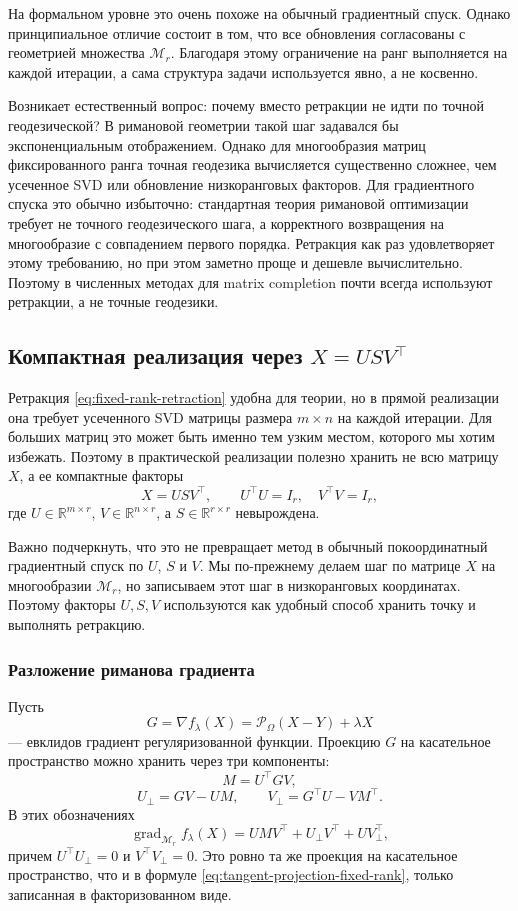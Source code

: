 \documentclass[a4paper,12pt]{article}
\newcommand{\R}{\mathbb{R}}
\newcommand{\grad}{\operatorname{grad}}
\renewcommand{\Proj}{\mathcal{P}}
\newcommand{\Mcal}{\mathcal{M}}
\begin{document}
На формальном уровне это очень похоже на обычный градиентный спуск. Однако принципиальное отличие состоит в том, что все обновления согласованы с геометрией множества $\Mcal_r$. Благодаря этому ограничение на ранг выполняется на каждой итерации, а сама структура задачи используется явно, а не косвенно.

Возникает естественный вопрос: почему вместо ретракции не идти по точной геодезической? В римановой геометрии такой шаг задавался бы экспоненциальным отображением. Однако для многообразия матриц фиксированного ранга точная геодезика вычисляется существенно сложнее, чем усеченное SVD или обновление низкоранговых факторов. Для градиентного спуска это обычно избыточно: стандартная теория римановой оптимизации требует не точного геодезического шага, а корректного возвращения на многообразие с совпадением первого порядка. Ретракция как раз удовлетворяет этому требованию, но при этом заметно проще и дешевле вычислительно. Поэтому в численных методах для matrix completion почти всегда используют ретракции, а не точные геодезики.

\subsection{Компактная реализация через $X=USV^\top$}

Ретракция \eqref{eq:fixed-rank-retraction} удобна для теории, но в прямой реализации она требует усеченного SVD матрицы размера $m\times n$ на каждой итерации. Для больших матриц это может быть именно тем узким местом, которого мы хотим избежать. Поэтому в практической реализации полезно хранить не всю матрицу $X$, а ее компактные факторы
\[
X=USV^\top,\qquad U^\top U=I_r,\quad V^\top V=I_r,
\]
где $U\in\R^{m\times r}$, $V\in\R^{n\times r}$, а $S\in\R^{r\times r}$ невырождена.

Важно подчеркнуть, что это не превращает метод в обычный покоординатный градиентный спуск по $U$, $S$ и $V$. Мы по-прежнему делаем шаг по матрице $X$ на многообразии $\Mcal_r$, но записываем этот шаг в низкоранговых координатах. Поэтому факторы $U,S,V$ используются как удобный способ хранить точку и выполнять ретракцию.

\subsubsection{Разложение риманова градиента}

Пусть
\[
G=\nabla f_\lambda(X)=\Proj_\Omega(X-Y)+\lambda X
\]
--- евклидов градиент регуляризованной функции. Проекцию $G$ на касательное пространство можно хранить через три компоненты:
\[
M=U^\top G V,
\]
\[
U_\perp=GV-UM,\qquad V_\perp=G^\top U-VM^\top.
\]
В этих обозначениях
\[
\grad_{\Mcal_r} f_\lambda(X)
=UMV^\top+U_\perp V^\top+UV_\perp^\top,
\]
причем $U^\top U_\perp=0$ и $V^\top V_\perp=0$. Это ровно та же проекция на касательное пространство, что и в формуле \eqref{eq:tangent-projection-fixed-rank}, только записанная в факторизованном виде.
\end{document}
